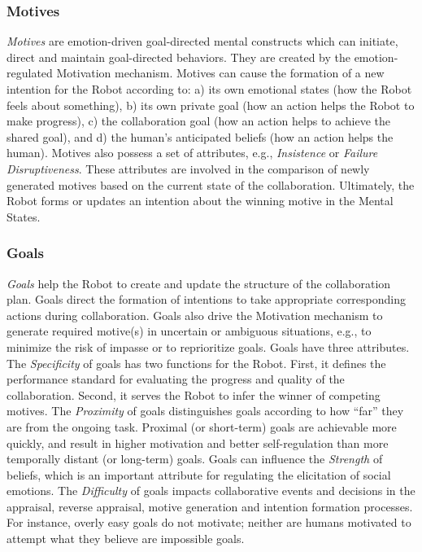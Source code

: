 \subsubsection{Motives}
\label{sec:motives}

\textit{Motives} are emotion-driven goal-directed mental constructs which can
initiate, direct and maintain goal-directed behaviors. They are created by the
emotion-regulated Motivation mechanism. Motives can cause the formation of a new
intention for the Robot according to: a) its own emotional states (how the Robot
feels about something), b) its own private goal (how an action helps the Robot
to make progress), c) the collaboration goal (how an action helps to achieve the
shared goal), and d) the human's anticipated beliefs (how an action helps the
human). Motives also possess a set of attributes, e.g., \textit{Insistence} or
\textit{Failure Disruptiveness}. These attributes are involved in the comparison
of newly generated motives based on the current state of the collaboration.
Ultimately, the Robot forms or updates an intention about the winning motive in
the Mental States.

\subsubsection{Goals}
\label{sec:goals}

\textit{Goals} help the Robot to create and update the structure of the
collaboration plan. Goals direct the formation of intentions to take appropriate
corresponding actions during collaboration. Goals also drive the Motivation
mechanism to generate required motive(s) in uncertain or ambiguous situations,
e.g., to minimize the risk of impasse or to reprioritize goals. Goals have
three attributes. The \textit{Specificity} of goals has two functions for the
Robot. First, it defines the performance standard for evaluating the progress
and quality of the collaboration. Second, it serves the Robot to infer the
winner of competing motives. The \textit{Proximity} of goals distinguishes goals
according to how ``far'' they are from the ongoing task. Proximal (or
short-term) goals are achievable more quickly, and result in higher motivation
and better self-regulation than more temporally distant (or long-term) goals.
Goals can influence the \textit{Strength} of beliefs, which is an important
attribute for regulating the elicitation of social emotions. The
\textit{Difficulty} of goals impacts collaborative events and decisions in the
appraisal, reverse appraisal, motive generation and intention formation
processes. For instance, overly easy goals do not motivate; neither are humans
motivated to attempt what they believe are impossible goals.

